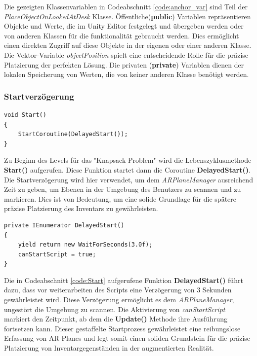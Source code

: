 Die gezeigten Klassenvariablen in Codeabschnitt \ref{code:anchor_var} sind Teil der \textit{PlaceObjectOnLookedAtDesk} Klasse.
Öffentliche(\textbf{public}) Variablen repräsentieren Objekte und Werte, die im Unity Editor festgelegt und übergeben werden
oder von anderen Klassen für die funktionalität gebraucht werden. Dies ermöglicht einen direkten Zugriff auf diese Objekte in der
eigenen oder einer anderen Klasse. Die Vektor-Variable \textit{objectPosition} spielt eine
entscheidende Rolle für die präzise Platzierung der perfekten Lösung. Die privaten (\textbf{private}) Variablen dienen
der lokalen Speicherung von Werten, die von keiner anderen Klasse benötigt werden.

\subsubsection{Startverzögerung}
\begin{lstlisting}[style=csharp, caption={Beginn des Anchor Scripts}, label=code:Start]
void Start()
{
    StartCoroutine(DelayedStart());
}
\end{lstlisting}
Zu Beginn des Levels für das "Knapsack-Problem" wird die Lebenszyklusmethode \textbf{Start()} aufgerufen. Diese Funktion
startet dann die Coroutine \textbf{DelayedStart()}. Die Startverzögerung wird hier verwendet, um dem \textit{ARPlaneManager}
ausreichend Zeit zu geben, um Ebenen in der Umgebung des Benutzers zu scannen und zu markieren. Dies ist von Bedeutung,
um eine solide Grundlage für die spätere präzise Platzierung des Inventars zu gewährleisten.\\

\begin{lstlisting}[style=csharp, caption={Verzoegerter Start}, label=code:DelayedStart]
private IEnumerator DelayedStart()
{
    yield return new WaitForSeconds(3.0f);
    canStartScript = true;
}
\end{lstlisting}
Die in Codeabschnitt \ref{code:Start} aufgerufene Funktion \textbf{DelayedStart()} führt dazu, dass vor weiterarbeiten
des Scripts eine Verzögerung von 3 Sekunden gewährleistet wird. Diese Verzögerung ermöglicht es dem \textit{ARPlaneManager},
ungestört die Umgebung zu scannen. Die Aktivierung von \textit{canStartScript} markiert den Zeitpunkt, ab dem die
\textbf{Update()} Methode ihre Ausführung fortsetzen kann. Dieser gestaffelte Startprozess gewährleistet eine reibungslose
Erfassung von AR-Planes und legt somit einen soliden Grundstein für die präzise Platzierung von Inventargegenständen
in der augmentierten Realität.

